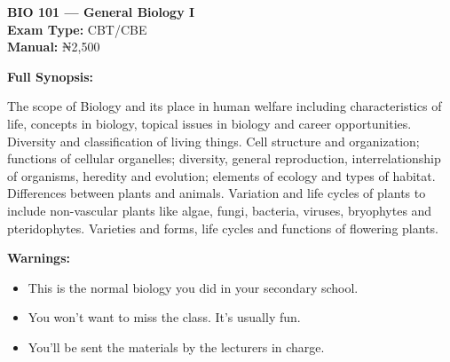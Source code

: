 \documentclass[11pt,a4paper]{article}
\begin{document}
\begin{coursebox}
    \textbf{\color{primary}\Large BIO 101 --- General Biology I}\\[0.3em]
    \textbf{Exam Type:} CBT/CBE \\
    \textbf{Manual:} ₦2,500

    \vspace{0.8em}

    \textbf{Full Synopsis:}

    The scope of Biology and its place in human welfare including characteristics of life, concepts in biology, topical issues in biology and career opportunities. Diversity and classification of living things. Cell structure and organization; functions of cellular organelles; diversity, general reproduction, interrelationship of organisms, heredity and evolution; elements of ecology and types of habitat. Differences between plants and animals. Variation and life cycles of plants to include non-vascular plants like algae, fungi, bacteria, viruses, bryophytes and pteridophytes. Varieties and forms, life cycles and functions of flowering plants.

    \vspace{0.8em}

    \textbf{\color{warningText}Warnings:}
    \begin{itemize}[leftmargin=1.5em, itemsep=0.2em]
        \item This is the normal biology you did in your secondary school.
        \item You won't want to miss the class. It's usually fun.
        \item You'll be sent the materials by the lecturers in charge.
    \end{itemize}
\end{coursebox}
\end{document}
